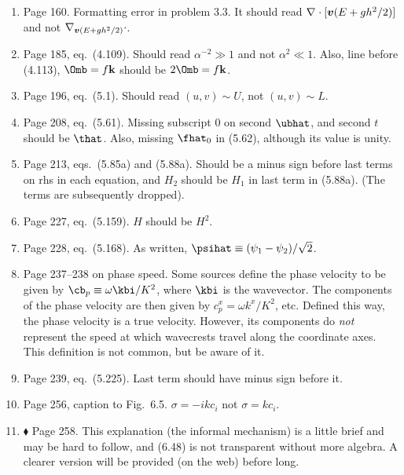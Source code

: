 \documentclass[10pt]{article}
\newcommand{\eq}{eq.\ } \newcommand{\Eq}{Eq.\ }
\renewcommand{\star}{\ensuremath{\blacklozenge} }
\begin{document}
\begin{enumerate}
\item Page 160. Formatting error in problem 3.3. It should read $\div[][\vb(E + gh^2/2)]$ and not $\div[\vb(E + gh^2/2)]$. 


\item Page 185, \eq (4.109). Should read $\alpha^{-2} \gg 1$ and not $\alpha^2 \ll 1$. Also, line before (4.113), $\Omb = f \kb$ should be $2\Omb = f \kb$.

\item Page 196, \eq (5.1). Should read $(u, v) \sim U$, not $(u,v) \sim L$.

\item Page 208, \eq (5.61). Missing subscript 0 on second $\ubhat$, and second $t$ should be $\that$. Also, missing $\fhat_0$ in (5.62), although its value is unity.

\item Page 213, eqs.\ (5.85a) and (5.88a). Should be a minus sign before last terms on rhs in each equation, and $H_2$ should be $H_1$ in last term in (5.88a). (The terms are subsequently dropped).  

\item Page 227, \eq (5.159). $H$ should be $H^2$.

\item Page 228, \eq (5.168). As written, $\psihat \equiv (\psi_1 -\psi_2)/\sqrt 2$.

\item Page 237--238 on phase speed. Some sources define the phase velocity to be given by $\cb_p \equiv \omega \kbi / K^2$, where $\kbi$ is the wavevector. The components of the phase velocity are then given by $c^x_p = \omega k^x/K^2$, etc. Defined this way, the phase velocity is a true velocity. However, its components do \emph{not} represent the speed at which wavecrests travel along the coordinate axes. This definition is not common, but be aware of it. 

\item Page 239, \eq (5.225). Last term should have minus sign before it.


\item Page 256, caption to Fig.\ 6.5. $\sigma = -i k c_i$ not $\sigma = kc_i$.


\item \star \label{informal} Page 258. This explanation (the informal mechanism) is a little brief and may be hard to follow, and (6.48) is not transparent without more algebra. A clearer version will be provided (on the web) before long. 


\end{enumerate}
\end{document}
